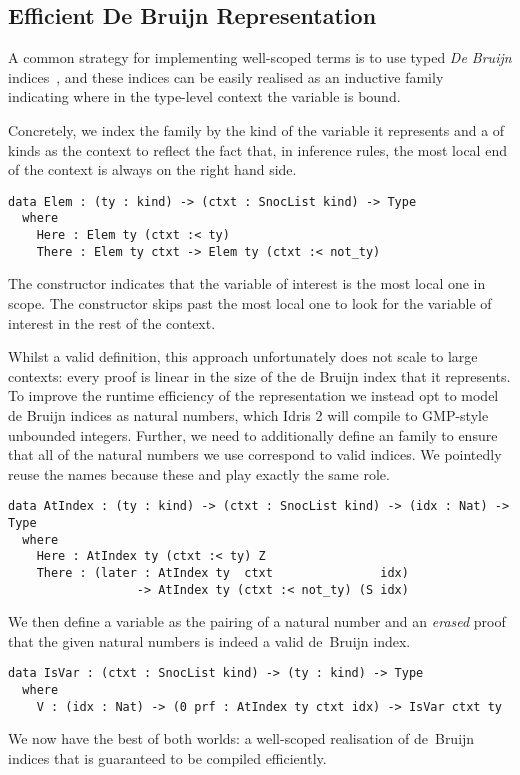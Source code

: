 \subsection{Efficient De Bruijn Representation}
\label{sec:design:deBruijn}

A common strategy for implementing well-scoped terms is to use typed
\emph{De Bruijn} indices~\cite{MANUAL:journals/math/debruijn72}, and these indices can be easily realised as an inductive family~\cite{DBLP:journals/fac/Dybjer94}
indicating where in the type-level context the variable is bound.

Concretely, we index the  family by the kind of the variable it represents and a  of kinds as the context to reflect the fact that,
in inference rules, the most local end of the context is always on the right hand side.

\begin{verbatim}
data Elem : (ty : kind) -> (ctxt : SnocList kind) -> Type
  where
    Here : Elem ty (ctxt :< ty)
    There : Elem ty ctxt -> Elem ty (ctxt :< not_ty)
\end{verbatim}

The  constructor indicates that the variable of interest is
the most local one in scope.
%
The  constructor skips past the most local one to look for
the variable of interest in the rest of the context.

Whilst a valid definition, this approach unfortunately does not scale to
large contexts: every  proof is linear in the size of the de Bruijn
index that it represents.
%
To improve the runtime efficiency of the representation we instead opt to
model de Bruijn indices as natural numbers, which Idris 2 will compile to
GMP-style unbounded integers.
%
Further, we need to additionally define an  family to ensure that
all of the natural numbers we use correspond to valid indices.
%
We pointedly reuse the  names because these 
and  play exactly the same role.

\begin{verbatim}
data AtIndex : (ty : kind) -> (ctxt : SnocList kind) -> (idx : Nat) -> Type
  where
    Here : AtIndex ty (ctxt :< ty) Z
    There : (later : AtIndex ty  ctxt               idx)
                  -> AtIndex ty (ctxt :< not_ty) (S idx)
\end{verbatim}

\noindent
We then define a variable as the pairing of a natural number and an \emph{erased}
proof that the given natural numbers is indeed a valid de~Bruijn index.

\begin{verbatim}
data IsVar : (ctxt : SnocList kind) -> (ty : kind) -> Type
  where
    V : (idx : Nat) -> (0 prf : AtIndex ty ctxt idx) -> IsVar ctxt ty
\end{verbatim}

We now have the best of both worlds: a well-scoped realisation of de~Bruijn indices
that is guaranteed to be compiled efficiently.


